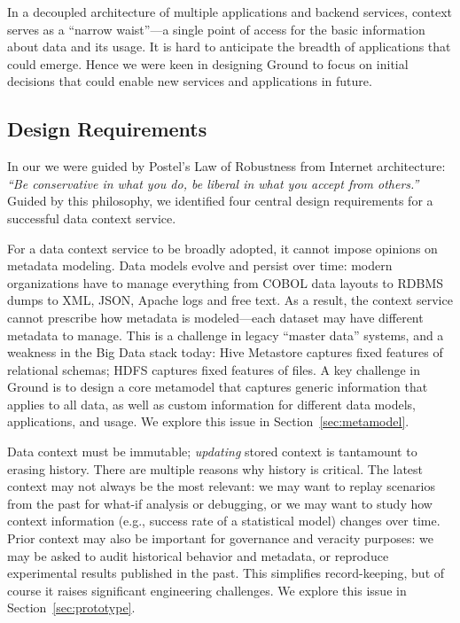 \documentclass{sig-alternate}
\begin{document}
In a decoupled architecture of multiple applications and backend services, context serves as a ``narrow waist''---a single point of access for the basic information about data and its usage. It is hard to anticipate the breadth of applications that could emerge.
Hence we were keen in designing Ground to focus on initial decisions that could enable new services and applications in future. 

\subsection{Design Requirements}
In our we were guided by Postel's Law of Robustness from Internet architecture: \emph{``Be conservative in what you do, be liberal in what you accept from others.''}  %
Guided by this philosophy, we identified four central design requirements for a successful data context service.

 For a data context service to be broadly adopted, it cannot impose opinions on metadata modeling. 
Data models evolve and persist over time: modern organizations have to manage everything from COBOL data layouts to RDBMS dumps to XML, JSON, Apache logs and free text. 
As a result, the context service cannot 
prescribe 
how metadata is modeled---each dataset may have different metadata to manage. 
This is a challenge in legacy ``master data'' systems, and  a weakness in the Big Data stack today: Hive Metastore captures fixed features of relational schemas; HDFS captures fixed features of files.  
A key challenge in Ground is to design a core metamodel that captures generic information that applies to all data, as well as custom information for different data models, applications, and usage.
We explore this issue in Section~\ref{sec:metamodel}.

 Data context must be immutable; \emph{updating} stored context is tantamount to erasing history. %
There are multiple reasons why history is critical. 
The latest context may not always be the most relevant: we may want to replay scenarios from the past for what-if analysis or debugging, or we may want to study how context information (e.g., success rate of a statistical model) changes over time.
Prior context may also be important for governance and veracity purposes: we may be asked to audit historical behavior and metadata, or reproduce experimental results published in the past. 
This simplifies record-keeping, but of course it raises significant engineering challenges.  
We explore this issue in Section~\ref{sec:prototype}.
\end{document}
